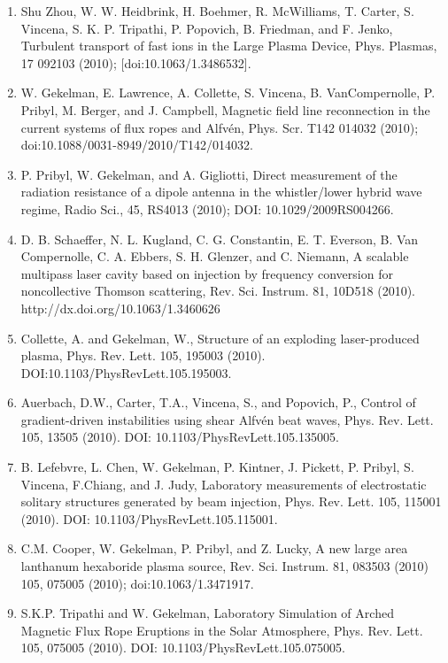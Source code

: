 \documentclass[11pt]{article}
\begin{document}
\begin{enumerate}
\item Shu Zhou, W. W. Heidbrink, H. Boehmer, R. McWilliams, T. Carter, S. Vincena, S. K. P. Tripathi, P. Popovich, B. Friedman, and F. Jenko, Turbulent transport of fast ions in the Large Plasma Device, Phys. Plasmas, 17 092103 (2010); [doi:10.1063/1.3486532].

\item  W. Gekelman, E. Lawrence, A. Collette, S. Vincena, B. VanCompernolle, P. Pribyl, M. Berger, and J. Campbell, Magnetic field line reconnection in the current systems of flux ropes and Alfv\'{e}n, Phys. Scr. T142 014032 (2010); doi:10.1088/0031-8949/2010/T142/014032.

\item  P. Pribyl, W. Gekelman, and A. Gigliotti, Direct measurement of the radiation resistance of a dipole antenna in the whistler/lower hybrid wave regime, Radio Sci., 45, RS4013 (2010); DOI: 10.1029/2009RS004266.

\item  D. B. Schaeffer, N. L. Kugland, C. G. Constantin, E. T. Everson, B. Van Compernolle, C. A. Ebbers, S. H. Glenzer, and C. Niemann, A scalable multipass laser cavity based on injection by frequency conversion for noncollective Thomson scattering, Rev. Sci. Instrum. 81, 10D518 (2010).  http://dx.doi.org/10.1063/1.3460626

\item  Collette, A. and Gekelman, W., Structure of an exploding laser-produced plasma, Phys. Rev. Lett. 105, 195003 (2010). DOI:10.1103/PhysRevLett.105.195003.

\item  Auerbach, D.W., Carter, T.A., Vincena, S., and Popovich, P., Control of gradient-driven instabilities using shear Alfv\'{e}n beat waves, Phys. Rev. Lett. 105, 13505 (2010). DOI: 10.1103/PhysRevLett.105.135005.

\item  B. Lefebvre, L. Chen, W. Gekelman, P. Kintner, J. Pickett, P. Pribyl, S. Vincena, F.Chiang, and J. Judy, Laboratory measurements of electrostatic solitary structures generated by beam injection, Phys. Rev. Lett. 105, 115001 (2010). DOI: 10.1103/PhysRevLett.105.115001.

\item  C.M. Cooper, W. Gekelman, P. Pribyl, and Z. Lucky, A new large area lanthanum hexaboride plasma source, Rev. Sci. Instrum. 81, 083503 (2010) 105, 075005 (2010); doi:10.1063/1.3471917.

\item   S.K.P. Tripathi and W. Gekelman, Laboratory Simulation of Arched Magnetic Flux Rope Eruptions in the Solar Atmosphere, Phys. Rev. Lett. 105, 075005 (2010). DOI: 10.1103/PhysRevLett.105.075005.


\end{enumerate}
\end{document}
